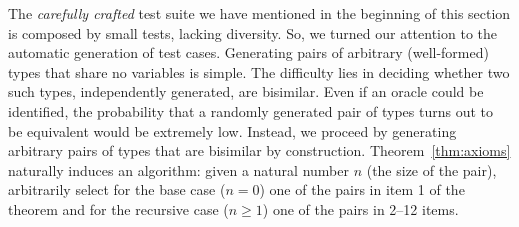 
The \emph{carefully crafted} test suite we have mentioned in the beginning
of this section is composed by small tests, lacking diversity.
So, we turned our attention to the automatic generation of test
cases. Generating pairs of arbitrary (well-formed) types that share no
variables is simple. The difficulty lies in deciding whether two such
types, independently generated, are bisimilar. Even if an oracle could
be identified, the probability that a randomly generated pair of types
turns out to be equivalent would be extremely low. Instead, we proceed
by generating arbitrary pairs of types that are bisimilar by
construction. Theorem~\ref{thm:axioms} naturally induces an algorithm:
given a natural number $n$ (the size of the pair), arbitrarily select
for the base case ($n=0$) one of the pairs in item 1 of the theorem
and for the recursive case ($n\ge1$) one of the pairs in 2--12 items.

